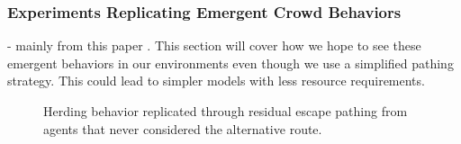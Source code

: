 \documentclass[12pt,letterpaper]{article}
\begin{document}
\subsubsection{Experiments Replicating Emergent Crowd Behaviors}
- mainly from this paper \cite{almeidaCrowdSimulationModeling2013}  .  This section will cover how we hope to see these emergent behaviors in our environments even though we use a simplified pathing strategy.  This could lead to simpler models with less resource requirements.



\begin{figure}[!tbp]
  \centering
  \hfill
  \caption{Herding behavior replicated through residual escape pathing from agents that never considered the alternative route.}
\end{figure}
\end{document}
